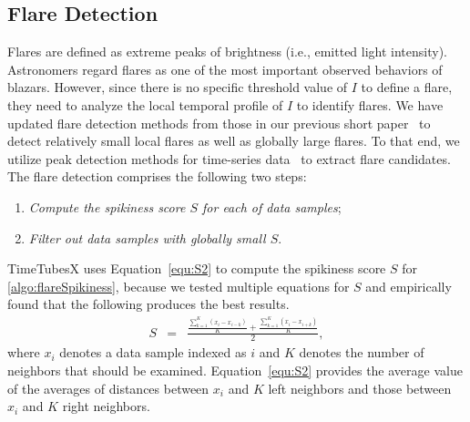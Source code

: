 \subsection{Flare Detection}\label{sec:flareDetection}
Flares are defined as extreme peaks of brightness (i.e., emitted light intensity). 
Astronomers regard flares as one of the most important observed behaviors of blazars.
However, since there is no specific threshold value of $I$ to define a flare, 
they need to analyze the local temporal profile of $I$ to identify flares.
We have updated flare detection methods from those in our previous short paper~\cite{Sawada2018}
to detect relatively small local flares as well as globally large flares.
To that end, we utilize peak detection methods for time-series data~\cite{Palshikar2009} to extract flare candidates. 
The flare detection comprises the following two steps:
\begin{enumerate}[nosep, label=\textsl{Step \arabic*}, align=parleft, leftmargin=*]
    \item \textsl{Compute the spikiness score $S$ for each of data samples}; \label{algo:flareSpikiness}
    \item \textsl{Filter out data samples with globally small $S$}. \label{algo:flareFilter}
\end{enumerate}
TimeTubesX uses Equation~\ref{equ:S2} to compute the spikiness score $S$ for \ref{algo:flareSpikiness},
because we tested multiple equations for $S$ and empirically found that the following produces the best results.
\begin{eqnarray}
    S &=& \frac{\frac{\sum_{k=1}^{K}(x_i - x_{i - k})}{K} + \frac{\sum_{k=1}^{K}(x_i - x_{i + k})}{K}}{2}\label{equ:S2},
\end{eqnarray}
where $x_i$ denotes a data sample indexed as $i$ and $K$ denotes the number of neighbors that should be examined.
Equation~\ref{equ:S2} provides the average value of the averages of distances between $x_i$ and $K$ left neighbors and those between $x_i$ and $K$ right neighbors.
